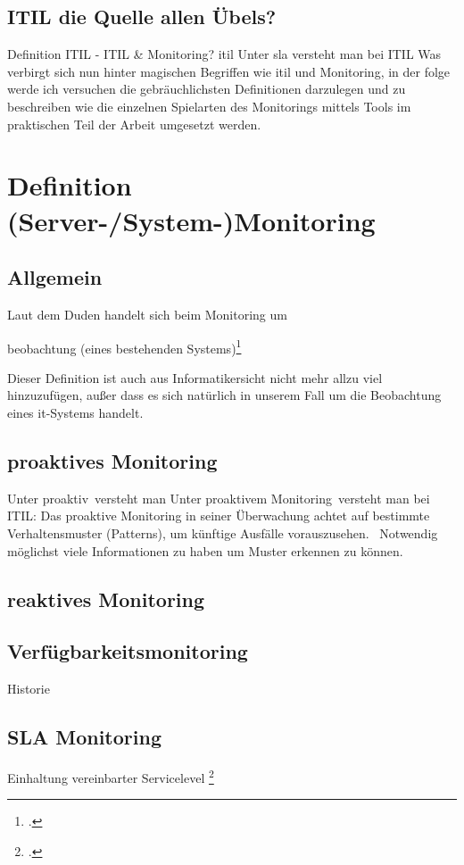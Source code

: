 \documentclass[12pt,a4paper,parskip]{scrreprt}
\begin{document}
	\subsection{ITIL die Quelle allen Übels?}
	Definition ITIL - ITIL \& Monitoring?
	\acrfull{itil}
	Unter \acrfull{sla} versteht man bei ITIL 
	Was verbirgt sich nun hinter magischen Begriffen wie \gls{itil} und Monitoring, in der folge werde ich versuchen die gebräuchlichsten Definitionen darzulegen und zu beschreiben wie die einzelnen Spielarten des Monitorings mittels Tools im praktischen Teil der Arbeit umgesetzt werden.
	\section{Definition (Server-/System-)Monitoring}
	\subsection{Allgemein}
	Laut dem Duden handelt sich beim Monitoring um
	\begin{center}
		\glqq[Dauer]beobachtung (eines bestehenden Systems)\grqq\footcite[S. 701; Stichwort Monitoring]{duden}
	\end{center}
	Dieser Definition ist auch aus Informatikersicht nicht mehr allzu viel hinzuzufügen, außer dass es sich natürlich in unserem Fall um die Beobachtung eines \acrshort{it}-Systems handelt.
	\subsection{proaktives Monitoring}
	Unter \glqq proaktiv\grqq\ versteht man 
	Unter \glqq proaktivem Monitoring\grqq\ versteht man bei ITIL: \glqq Das proaktive Monitoring in seiner Überwachung achtet auf bestimmte Verhaltensmuster (Patterns), um künftige Ausfälle vorauszusehen. \grqq\ 
	Notwendig möglichst viele Informationen zu haben um Muster erkennen zu können.
	\subsection{reaktives Monitoring}
	\subsection{Verfügbarkeitsmonitoring}
	Historie
	\subsection{SLA Monitoring}
	Einhaltung vereinbarter Servicelevel \footcite[40]{iso20000sla}
\end{document}
